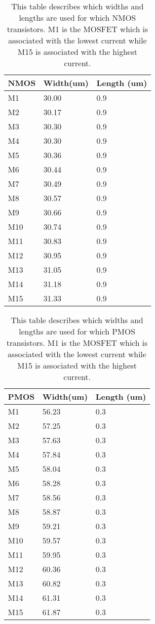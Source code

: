 \begin{table}[h!]
\caption{This table describes which widths and lengths are used for which NMOS transistors. M1 is the MOSFET which is associated with the lowest current while M15 is associated with the highest current.}
\begin{tabular}{l||l|l}\arraybackslash
NMOS & Width(um) & Length (um) \\\hline\hline
M1 & 30.00 & 0.9\\\hline
M2 & 30.17 & 0.9\\\hline
M3 & 30.30 & 0.9\\\hline
M4 &  30.30 & 0.9\\\hline
M5 & 30.36 & 0.9\\\hline
M6 & 30.44 & 0.9\\\hline
M7 & 30.49 & 0.9\\\hline
M8 & 30.57 & 0.9\\\hline
M9 & 30.66 & 0.9\\\hline
M10 & 30.74 & 0.9\\\hline
M11 & 30.83 & 0.9\\\hline
M12 & 30.95 & 0.9\\\hline
M13 & 31.05 & 0.9\\\hline
M14 & 31.18 & 0.9\\\hline
M15 & 31.33 & 0.9
\end{tabular}
\label{Tab:NMOS}
\end{table}
\begin{table}
\caption{This table describes which widths and lengths are used for which PMOS transistors. M1 is the MOSFET which is associated with the lowest current while M15 is associated with the highest current.} 
\begin{tabular}{l||l|l}
PMOS & Width(um) & Length (um) \\\hline\hline
M1 & 56.23 & 0.3\\\hline
M2 & 57.25 & 0.3\\\hline
M3 & 57.63 & 0.3\\\hline
M4 & 57.84& 0.3\\\hline
M5 & 58.04 & 0.3\\\hline
M6 & 58.28 & 0.3\\\hline
M7 & 58.56 & 0.3\\\hline
M8 & 58.87 & 0.3\\\hline
M9 & 59.21 & 0.3\\\hline
M10 & 59.57 & 0.3\\\hline
M11 & 59.95 & 0.3\\\hline
M12 & 60.36 & 0.3\\\hline
M13 & 60.82 & 0.3\\\hline
M14 & 61.31 & 0.3\\\hline
M15 & 61.87 & 0.3
\end{tabular}
\label{Tab:PMOS}
\end{table}

